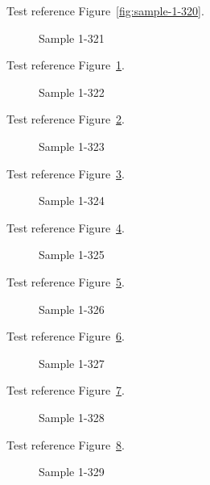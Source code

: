 Test reference Figure~\ref{fig:sample-1-320}.

\begin{figure}[tbhp]
\caption{Sample 1-321}
\label{fig:sample-1-321}
\end{figure}

Test reference Figure~\ref{fig:sample-1-321}.

\begin{figure}[tbhp]
\caption{Sample 1-322}
\label{fig:sample-1-322}
\end{figure}

Test reference Figure~\ref{fig:sample-1-322}.

\begin{figure}[tbhp]
\caption{Sample 1-323}
\label{fig:sample-1-323}
\end{figure}

Test reference Figure~\ref{fig:sample-1-323}.

\begin{figure}[tbhp]
\caption{Sample 1-324}
\label{fig:sample-1-324}
\end{figure}

Test reference Figure~\ref{fig:sample-1-324}.

\begin{figure}[tbhp]
\caption{Sample 1-325}
\label{fig:sample-1-325}
\end{figure}

Test reference Figure~\ref{fig:sample-1-325}.

\begin{figure}[tbhp]
\caption{Sample 1-326}
\label{fig:sample-1-326}
\end{figure}

Test reference Figure~\ref{fig:sample-1-326}.

\begin{figure}[tbhp]
\caption{Sample 1-327}
\label{fig:sample-1-327}
\end{figure}

Test reference Figure~\ref{fig:sample-1-327}.

\begin{figure}[tbhp]
\caption{Sample 1-328}
\label{fig:sample-1-328}
\end{figure}

Test reference Figure~\ref{fig:sample-1-328}.

\begin{figure}[tbhp]
\caption{Sample 1-329}
\label{fig:sample-1-329}
\end{figure}

